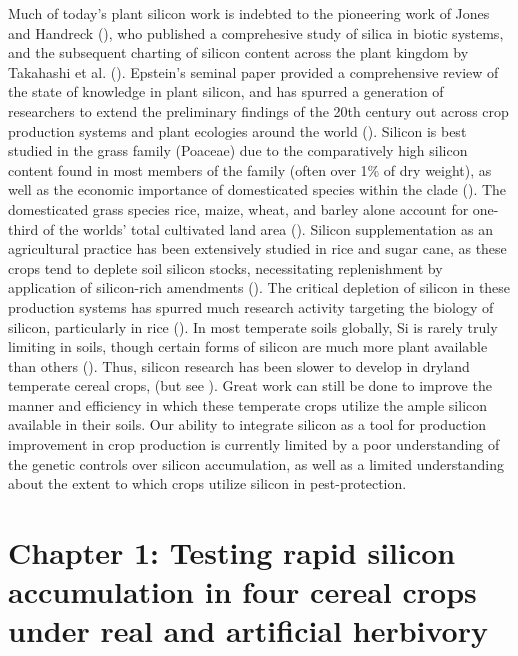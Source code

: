 \documentclass[12pt, letterpaper, ]{report}
\begin{document}
Much of today’s plant silicon work is indebted to the pioneering work of Jones and Handreck (\citeyear{jones_silica_1967}), who published a comprehesive study of silica in biotic systems, and the subsequent charting of silicon content across the plant kingdom by Takahashi et al. (\citeyear{takahashi_possibility_1990}). Epstein’s seminal \citeyear{epstein_silicon_1999} paper provided a comprehensive review of the state of knowledge in plant silicon, and has spurred a generation of researchers to extend the preliminary findings of the 20th century out across crop production systems and plant ecologies around the world (\cite{coskun_controversies_2019,hartley_ecology_2016,cooke_is_2011,christian_breeding_2022,de_tombeur_silicon_2021}). Silicon is best studied in the grass family (Poaceae) due to the comparatively high silicon content found in most members of the family (often over 1\% of dry weight), as well as the economic importance of domesticated species within the clade (\cite{reynolds_silicon_2016}). The domesticated grass species rice, maize, wheat, and barley alone account for one-third of the worlds’ total cultivated land area (\cite{faostat}). Silicon supplementation as an agricultural practice has been extensively studied in rice and sugar cane, as these crops tend to deplete soil silicon stocks, necessitating replenishment by application of silicon-rich amendments (\cite{haynes_contemporary_2014,meena_case_2014}). The critical depletion of silicon in these production systems has spurred much research activity targeting the biology of silicon, particularly in rice (\cite{deren_variable_1992-1,dai_genetic_2005,rodrigues_silicon_2004,ye_priming_2013}). In most temperate soils globally, Si is rarely truly limiting in soils, though certain forms of silicon are much more plant available than others (\cite{fraysse_surface_2009}). Thus, silicon research has been slower to develop in dryland temperate cereal crops, (but see \cite{rains_active_2006,neu_silicon_2017,ahmad_silicon_2016}). Great work can still be done to improve the manner and efficiency in which these temperate crops utilize the ample silicon available in their soils. Our ability to integrate silicon as a tool for production improvement in crop production is currently limited by a poor understanding of the genetic controls over silicon accumulation, as well as a limited understanding about the extent to which crops utilize silicon in pest-protection. 

\printbibliography

\chapter{Chapter 1: Testing rapid silicon accumulation in four cereal crops under real and artificial herbivory}
\end{document}
